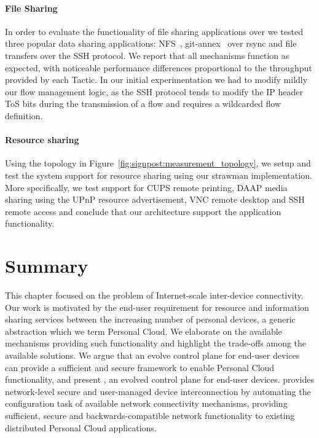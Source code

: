 \paragraph{File Sharing}

In order to evaluate the functionality of file sharing applications over
\signpost we tested three popular data sharing applications: NFS~\cite{RFC5661}, 
git-annex~\cite{git-annex} over rsync and file transfers over the SSH protocol.
We report that all mechanisms function as expected, with noticeable performance
differences proportional to the throughput provided by each Tactic. In our
initial experimentation we had to modify mildly our flow management logic, as
the SSH protocol tends to modify the IP header ToS bits during the transmission
of a flow and requires a wildcarded flow definition.  

\paragraph{Resource sharing}

Using the topology in Figure~\ref{fig:signpost:measurement_topology}, we setup
and test the system support for resource sharing using our strawman
implementation. More specifically, we test support for CUPS remote printing,
DAAP media sharing using the UPnP resource advertisement, VNC remote desktop and
SSH remote access and conclude that our \signpost architecture support the
application functionality.  

\section{Summary} \label{sec:signpost-conclusion}

This chapter focused on the problem of Internet-scale inter-device connectivity.
Our work is motivated by the end-user requirement for resource and information
sharing services between the increasing number of personal devices, a generic
abstraction which we term Personal Cloud. We elaborate on the available
mechanisms providing such functionality and highlight the trade-offs among the
available solutions. We argue that an evolve control plane for end-user devices
can provide a sufficient and secure framework to enable Personal Cloud
functionality, and present \signpost, an evolved control plane for end-user
devices.  \signpost provides network-level secure and user-managed device
interconnection by automating the configuration task of available network
connectivity mechanisms, providing sufficient, secure and backwards-compatible
network functionality to existing distributed Personal Cloud applications. 

